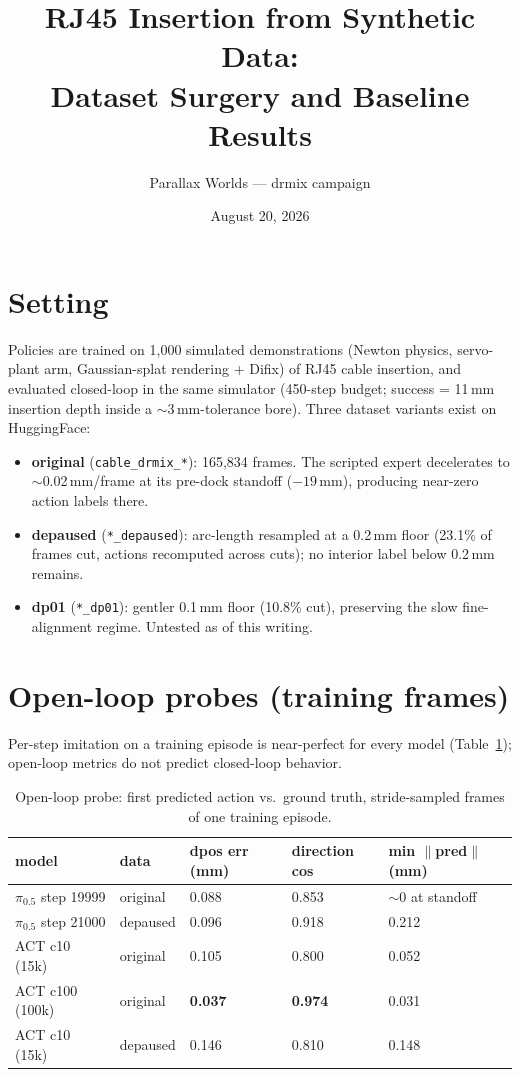 \documentclass[11pt]{article}
\title{RJ45 Insertion from Synthetic Data:\\ Dataset Surgery and Baseline Results}
\author{Parallax Worlds --- drmix campaign}
\date{August 20, 2026}
\begin{document}
\maketitle

\section{Setting}
Policies are trained on 1{,}000 simulated demonstrations (Newton physics, servo-plant
arm, Gaussian-splat rendering + Difix) of RJ45 cable insertion, and evaluated
closed-loop in the same simulator (450-step budget; success = 11\,mm insertion depth
inside a $\sim$3\,mm-tolerance bore). Three dataset variants exist on HuggingFace:

\begin{itemize}\itemsep2pt
  \item \textbf{original} (\texttt{cable\_drmix\_*}): 165{,}834 frames. The scripted
        expert decelerates to $\sim$0.02\,mm/frame at its pre-dock standoff
        ($-19$\,mm), producing near-zero action labels there.
  \item \textbf{depaused} (\texttt{*\_depaused}): arc-length resampled at a 0.2\,mm
        floor (23.1\% of frames cut, actions recomputed across cuts); no interior
        label below 0.2\,mm remains.
  \item \textbf{dp01} (\texttt{*\_dp01}): gentler 0.1\,mm floor (10.8\% cut),
        preserving the slow fine-alignment regime. Untested as of this writing.
\end{itemize}

\section{Open-loop probes (training frames)}
Per-step imitation on a training episode is near-perfect for every model
(Table~\ref{tab:probe}); open-loop metrics do not predict closed-loop behavior.

\begin{table}[h]\centering\small
\begin{tabular}{lllll}
\toprule
model & data & dpos err (mm) & direction cos & min $\lVert$pred$\rVert$ (mm) \\
\midrule
$\pi_{0.5}$ step 19999 & original & 0.088 & 0.853 & $\sim$0 at standoff \\
$\pi_{0.5}$ step 21000 & depaused & 0.096 & 0.918 & 0.212 \\
ACT c10 (15k)          & original & 0.105 & 0.800 & 0.052 \\
ACT c100 (100k)        & original & \textbf{0.037} & \textbf{0.974} & 0.031 \\
ACT c10 (15k)          & depaused & 0.146 & 0.810 & 0.148 \\
\bottomrule
\end{tabular}
\caption{Open-loop probe: first predicted action vs.\ ground truth, stride-sampled
frames of one training episode.}
\label{tab:probe}
\end{table}
\end{document}
